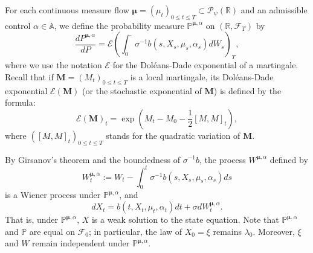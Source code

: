 \documentclass[11pt]{article}
\theoremstyle{definition}
\begin{document}
For each continuous measure flow $\bm{\mu}=(\mu_t)_{0\leq t\leq T} \subset \mathcal{P}_{\psi}(\mathbb{R})$ and an admissible control $\alpha \in \mathbb{A}$, we define the probability measure $\mathbb{P}^{\bm{\mu}, \alpha}$ on $( \mathbb{R},\mathcal{F}_T )$ by
$$\frac{dP^{\bm{\mu}, \alpha}}{dP} = \mathcal{E}\left(\int_0 ^{\cdot} \sigma^{-1} b(s, X_s, \mu_s, \alpha_s) dW_s\right)_T,$$
where we use the notation $\mathcal{E}$ for the Doléans-Dade exponential of a martingale. Recall that if $\mathbf{M}=(M_t)_{0\leq t\leq T}$ is a local martingale, its Doléans-Dade exponential $\mathcal{E}(\mathbf{M})$ (or the stochastic exponential of $\mathbf{M}$) is defined by the formula:
$$\mathcal{E}(\mathbf{M})_t=\exp\left(M_t-M_0-\frac{1}{2}[M,M]_t\right),$$
where $([M,M]_t)_{0\leq t\leq T}$ stands for the quadratic variation of $\mathbf{M}$.
    

By Girsanov's theorem and the boundedness of $\sigma^{-1} b$, the process $W^{\bm{\mu}, \alpha}$ defined by
$$W_t^{\bm{\mu}, \alpha} := W_t - \int_0 ^t \sigma^{-1} b(s, X_s, \mu_s, \alpha_s) ds$$
is a Wiener process under $\mathbb{P}^{\bm{\mu}, \alpha}$, and 
$$dX_t = b(t, X_t, \mu_t, \alpha_t) dt + \sigma dW_t^{\bm{\mu}, \alpha}.$$
That is, under $\mathbb{P}^{\bm{\mu}, \alpha}$, $X$ is a weak solution to the state equation. Note that $\mathbb{P}^{\bm{\mu}, \alpha}$ and $\mathbb{P}$ are equal on $\mathcal{F}_0$; in particular, the law of $X_0 = \xi$ remains $\lambda_0$. Moreover, $\xi$ and $W$ remain independent under $\mathbb{P}^{\bm{\mu}, \alpha}$.
\end{document}
